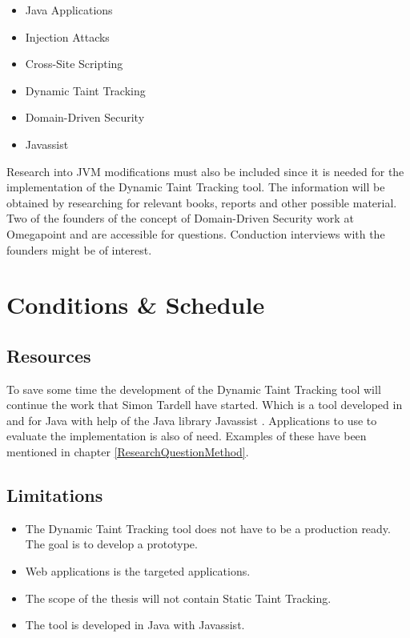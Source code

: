 \documentclass{../kththesis}
\begin{document}
		\begin{itemize}  
			\item Java Applications
			\item Injection Attacks
			\item Cross-Site Scripting
			\item Dynamic Taint Tracking
			\item Domain-Driven Security
			\item Javassist
		\end{itemize}
	
	\noindent
	Research into JVM modifications must also be included since it is needed for the implementation of the Dynamic Taint Tracking tool. The information will be obtained by researching for relevant books, reports and other possible material. Two of the founders of the concept of Domain-Driven Security work at Omegapoint and are accessible for questions. Conduction interviews with the founders might be of interest.
	
	
	
	\chapter{Conditions \& Schedule}
	\section{Resources}
	To save some time the development of the Dynamic Taint Tracking tool will continue the work that Simon Tardell have started. Which is a tool developed in and for Java with help of the Java library Javassist \parencite{Javassist}. Applications to use to evaluate the implementation is also of need. Examples of these have been mentioned in chapter \ref{ResearchQuestionMethod}.
	
	
	\section{Limitations}
	\begin{itemize}  
		\item The Dynamic Taint Tracking tool does not have to be a production ready. The goal is to develop a prototype.
		\item Web applications is the targeted applications.
		\item The scope of the thesis will not contain Static Taint Tracking.
		\item The tool is developed in Java with Javassist.
	\end{itemize}
	
\end{document}
